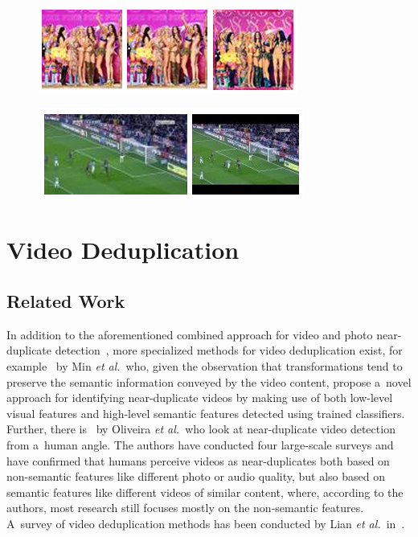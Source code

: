 \begin{figure}[h!]
  \centering
  \includegraphics[width=1.0\linewidth]{./close_duplicate.png}
  \caption[]{}
  \label{fig:}
\end{figure}

\begin{figure}[h!]
  \centering
  \includegraphics[width=1.0\linewidth]{./bwtolerance.png}
  \caption[]{}
  \label{fig:}
\end{figure}

\section{Video Deduplication}

\subsection{Related Work}

In addition to the aforementioned  combined approach
for video and photo near-duplicate
detection~\cite{yang2009nearduplicate},
more specialized methods for video deduplication exist,
for example~\cite{min2011nearduplicatevideo,wu2009nearduplicate}
by Min \emph{et al.}\ who, given the observation that 
transformations tend to preserve the semantic information conveyed
by the video content, propose a~novel approach for identifying
near-duplicate videos by making use of both low-level visual
features and high-level semantic features
detected using trained classifiers.
Further, there is~\cite{oliveira2010nearduplicate} by Oliveira
\emph{et al.}\ who look at near-duplicate video detection
from a~human angle.  
The authors have conducted four large-scale surveys
and have confirmed that humans perceive videos as near-duplicates
both based on non-semantic features like different photo or audio
quality, but also based on semantic features like different
videos of similar content, where, according to the authors,
most research still focuses mostly on the non-semantic features.
A~survey of video deduplication methods has been conducted by
Lian \emph{et al.}\ in~\cite{lian2010survey}.

